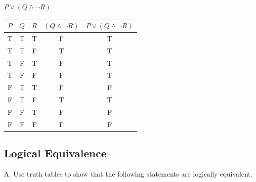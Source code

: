 \documentclass[DIN, pagenumber=false, fontsize=11pt, parskip=half]{scrartcl}
\begin{document}
\begin{problems}
    \problem $P \lor (Q \land \lnot R)$
    \answer
    \begin{center}
        \begin{tabular}{ccccc}
            $P$ & $Q$ & $R$ & $(Q \land \lnot R)$ & $P \lor (Q \land \lnot R)$\\ 
            \midrule
            T & T & T & F & T\\ 
            T & T & F & T & T\\ 
            T & F & T & F & T\\
            T & F & F & F & T\\
            F & T & T & F & F\\
            F & T & F & T & T\\ 
            F & F & T & F & F\\ 
            F & F & F & F & F
        \end{tabular}
    \end{center}

\end{problems}

\subsection{Logical Equivalence}

\begin{exercise}{A.}
    Use truth tables to show that the following statements are logically equivalent.
\end{exercise}
\end{document}

